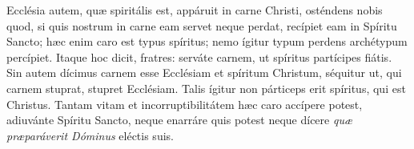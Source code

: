 {\noindent Ecclésia autem, quæ spiritális est, appáruit in carne Christi, osténdens nobis quod, si quis nostrum in carne eam servet neque perdat, recípiet eam in Spíritu Sancto; hæc enim caro est typus spíritus; nemo ígitur typum perdens archétypum percípiet. Itaque hoc dicit, fratres: serváte carnem, ut spíritus partícipes fiátis. Sin autem dícimus carnem esse Ecclésiam et spíritum Christum, séquitur ut, qui carnem stuprat, stupret Ecclésiam. Talis ígitur non párticeps erit spíritus, qui est Christus. Tantam vitam et incorruptibilitátem hæc caro accípere potest, adiuvánte Spíritu Sancto, neque enarráre quis potest neque dícere \emph{quæ præparáverit Dóminus} eléctis suis.}
\newcommand{\responsoriumiii}{\pars{Responsorium 3.} \scriptura{\Rbardot{} Dan. 6, 22 \Vbardot{} Ps. 56, 4.5; \textbf{H417}}

\vspace{-5mm}

\responsorium{V}{temporalia/resp-misitdominusangelumsuum-CROCHU-cumdox.gtex}{}}



